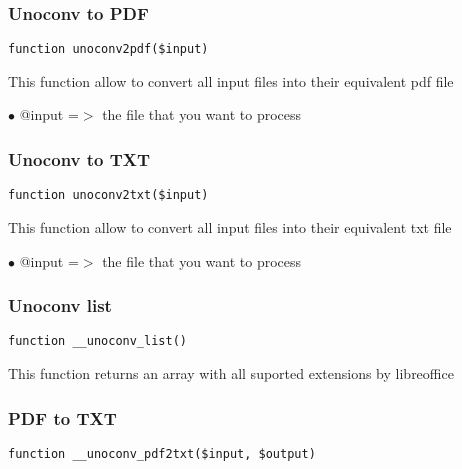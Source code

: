 \documentclass[a4paper]{article}
\begin{document}
\subsubsection{Unoconv to PDF}

\begin{lstlisting}
function unoconv2pdf($input)
\end{lstlisting}

This function allow to convert all input files into their equivalent pdf file

\begin{compactitem}
\item[\color{myblue}$\bullet$] @input =$>$ the file that you want to process
\end{compactitem}

\hypertarget{toc534}{}
\subsubsection{Unoconv to TXT}

\begin{lstlisting}
function unoconv2txt($input)
\end{lstlisting}

This function allow to convert all input files into their equivalent txt file

\begin{compactitem}
\item[\color{myblue}$\bullet$] @input =$>$ the file that you want to process
\end{compactitem}

\hypertarget{toc535}{}
\subsubsection{Unoconv list}

\begin{lstlisting}
function __unoconv_list()
\end{lstlisting}

This function returns an array with all suported extensions by libreoffice

\hypertarget{toc536}{}
\subsubsection{PDF to TXT}

\begin{lstlisting}
function __unoconv_pdf2txt($input, $output)
\end{lstlisting}
\end{document}
